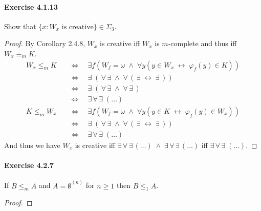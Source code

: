 \documentclass[a4paper,11pt]{article}
\begin{document}
\paragraph{Exercise 4.1.13}

Show that $\{ x : W_x \text{ is creative}\} \in \Sigma_3$.
\begin{proof}
By Corollary 2.4.8, $W_x$ is creative iff $W_x$ is $m$-complete and thus iff $W_x \equiv_m K$.
\begin{align*}
  W_x \leq_m K \quad & \Leftrightarrow \quad \exists f(W_f = \omega \; \wedge \; \forall y(y \in W_x \; \leftrightarrow \; \varphi_f(y) \in K))\\
  & \Leftrightarrow \quad \exists \; ( \, \forall \, \exists \; \wedge \; \forall \, ( \, \exists \; \leftrightarrow \; \exists \, ))\\
  & \Leftrightarrow \quad \exists \; ( \, \forall \, \exists \; \wedge \; \forall \, \exists \, )\\
  & \Leftrightarrow \quad \exists \, \forall \, \exists \; (\ldots)
\end{align*}
\begin{align*}
  K \leq_m W_x \quad & \Leftrightarrow \quad \exists f(W_f = \omega \; \wedge \; \forall y(y \in K \; \leftrightarrow \; \varphi_f(y) \in W_x))\\
  & \Leftrightarrow \quad \exists \; ( \, \forall \, \exists \; \wedge \; \forall \, ( \, \exists \; \leftrightarrow \; \exists \, ))\\
  & \Leftrightarrow \quad \exists \, \forall \, \exists \; (\ldots)
\end{align*}
And thus we have $W_x$ is creative iff $\exists \, \forall \, \exists \, (\ldots) \; \wedge \; \exists \, \forall \, \exists \, (\ldots)$ iff $\exists \, \forall \, \exists \; (\ldots)$.
\end{proof}



\paragraph{Exercise 4.2.7}

If $B \leq_m A$ and $A = \emptyset^{(n)}$ for $n \geq 1$ then $B \leq_1 A$.
\begin{proof}

\end{proof}
\end{document}
